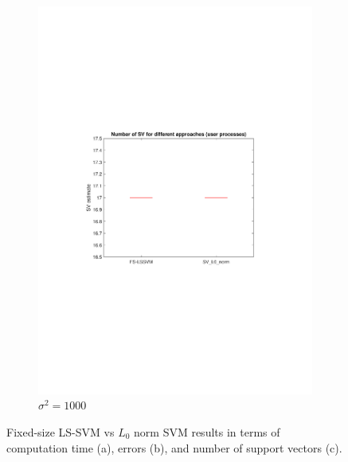 \documentclass{article}
\begin{document}
\begin{figure}[h]
\begin{subfigure}[b]{0.3\textwidth}
                 \includegraphics[width=\textwidth]{Assignment 3/figures/1_3/Number_of_support_vectors.pdf}
                 \caption{$\sigma^2 = 1000$}
                 \label{fig:l0Number_supports}
             \end{subfigure}
            \caption{Fixed-size LS-SVM vs $L_0$ norm SVM results in terms of computation time (a), errors (b), and number of support vectors (c).}
        \end{figure}
\end{document}
